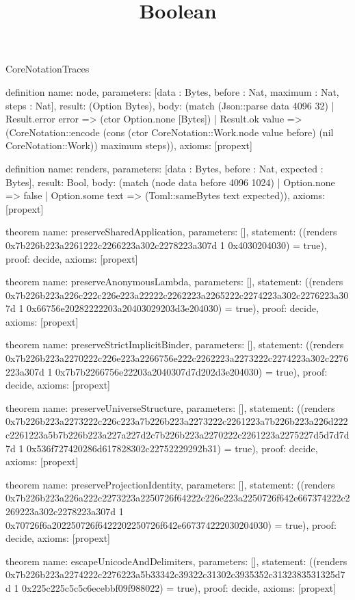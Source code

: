 \begin{lexlean}{CoreNotationTraces}
\title{Boolean}
\begin{semanticmodule}

definition{
 name: node,
 parameters: [data : Bytes, before : Nat, maximum : Nat, steps : Nat],
 result: (Option Bytes),
 body: (match (Json::parse data 4096 32) | Result.error error => (ctor Option.none [Bytes]) | Result.ok value => (CoreNotation::encode (cons (ctor CoreNotation::Work.node value before) (nil CoreNotation::Work)) maximum steps)),
 axioms: [propext]
}

definition{
 name: renders,
 parameters: [data : Bytes, before : Nat, expected : Bytes],
 result: Bool,
 body: (match (node data before 4096 1024) | Option.none => false | Option.some text => (Toml::sameBytes text expected)),
 axioms: [propext]
}

theorem{
 name: preserveSharedApplication,
 parameters: [],
 statement: ((renders 0x7b226b223a2261222c2266223a302c2278223a307d 1 0x4030204030) = true),
 proof: decide{},
 axioms: [propext]
}

theorem{
 name: preserveAnonymousLambda,
 parameters: [],
 statement: ((renders 0x7b226b223a226c222c226e223a22222c2262223a2265222c2274223a302c2276223a307d 1 0x66756e20282222203a20403029203d3e204030) = true),
 proof: decide{},
 axioms: [propext]
}

theorem{
 name: preserveStrictImplicitBinder,
 parameters: [],
 statement: ((renders 0x7b226b223a2270222c226e223a2266756e222c2262223a2273222c2274223a302c2276223a307d 1 0x7b7b2266756e22203a2040307d7d202d3e204030) = true),
 proof: decide{},
 axioms: [propext]
}

theorem{
 name: preserveUniverseStructure,
 parameters: [],
 statement: ((renders 0x7b226b223a2273222c226c223a7b226b223a2273222c2261223a7b226b223a226d222c2261223a5b7b226b223a227a227d2c7b226b223a2270222c2261223a2275227d5d7d7d7d 1 0x536f727420286d617828302c22752229292b31) = true),
 proof: decide{},
 axioms: [propext]
}

theorem{
 name: preserveProjectionIdentity,
 parameters: [],
 statement: ((renders 0x7b226b223a226a222c2273223a2250726f64222c226e223a2250726f642e667374222c2269223a302c2278223a307d 1 0x70726f6a202250726f6422202250726f642e667374222030204030) = true),
 proof: decide{},
 axioms: [propext]
}

theorem{
 name: escapeUnicodeAndDelimiters,
 parameters: [],
 statement: ((renders 0x7b226b223a2274222c2276223a5b33342c39322c31302c3935352c3132383531325d7d 1 0x225c225c5c5c6ecebbf09f988022) = true),
 proof: decide{},
 axioms: [propext]
}


\end{semanticmodule}
\end{lexlean}
